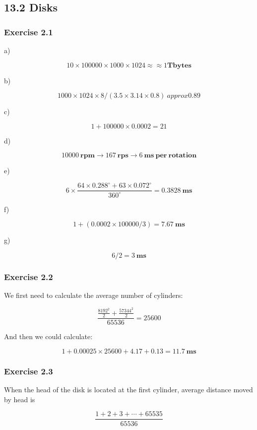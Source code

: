 \documentclass[../../main.tex]{subfiles}
\begin{document}
\hypertarget{Section13.2}{\subsection{13.2 Disks}}

\subsubsection*{Exercise 2.1}

a)

$$
10 \times 100000 \times 1000 \times 1024 \approx≈ 1 \mathbf{Tbytes}
$$

b)

$$
1000 \times 1024 \times 8 / (3.5 \times 3.14 \times 0.8)\ approx 0.89
$$

c)

$$
1 + 100000 \times 0.0002 = 21
$$

d)

$$
10000 \ \mathbf{rpm} \to 167 \ \mathbf{rps} \to 6 \ \mathbf{ms \ per \ rotation}
$$

e)

$$
6 \times \frac{64 \times 0.288^{\circ}  + 63 \times 0.072^{\circ}}{360^{\circ}} = 0.3828 \ \mathbf{ms}
$$

f)

$$
1 + (0.0002 \times 100000 / 3)=7.67 \ \mathbf{ms}
$$

g)

$$
6 / 2 = 3 \ \mathbf{ms}
$$

\subsubsection*{Exercise 2.2}

We first need to calculate the average number of cylinders:

$$
\frac{\frac{8192^2}{2} + \frac{57344^2}{2}}{65536} = 25600
$$

And then we could calculate:

$$
1 + 0.00025 \times 25600 + 4.17 + 0.13 = 11.7 \ \mathbf{ms}
$$

\subsubsection*{Exercise 2.3}

When the head of the disk is located at the first cylinder, average
distance moved by head is

$$
\frac{1 + 2 + 3  + \cdots + 65535}{65536}
$$
\end{document}
